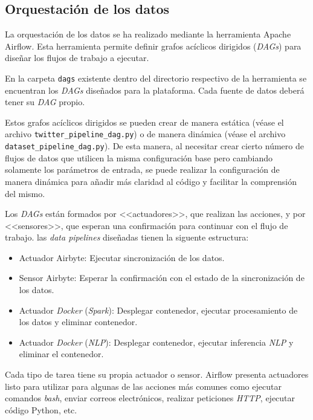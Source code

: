 \subsection{Orquestación de los datos}

La orquestación de los datos se ha realizado mediante la herramienta Apache Airflow. Esta herramienta permite definir grafos acíclicos dirigidos (\textit{DAGs}) para diseñar los flujos de trabajo a ejecutar.

En la carpeta \texttt{dags} existente dentro del directorio respectivo de la herramienta se encuentran los \textit{DAGs} diseñados para la plataforma. Cada fuente de datos deberá tener su \textit{DAG} propio.

Estos grafos acíclicos dirigidos se pueden crear de manera estática (véase el archivo \texttt{twitter\_pipeline\_dag.py}) o de manera dinámica (véase el archivo \texttt{dataset\_pipeline\_dag.py}). De esta manera, al necesitar crear cierto número de flujos de datos que utilicen la misma configuración base pero cambiando solamente los parámetros de entrada, se puede realizar la configuración de manera dinámica para añadir más claridad al código y facilitar la comprensión del mismo.

Los \textit{DAGs} están formados por <<actuadores>>, que realizan las acciones, y por <<sensores>>, que esperan una confirmación para continuar con el flujo de trabajo. las \textit{data pipelines} diseñadas tienen la siguente estructura:

\begin{itemize}
    \item Actuador Airbyte: Ejecutar sincronización de los datos.
    \item Sensor Airbyte: Esperar la confirmación con el estado de la sincronización de los datos.
    \item Actuador \textit{Docker} (\textit{Spark}): Desplegar contenedor, ejecutar procesamiento de los datos y eliminar contenedor.
    \item Actuador \textit{Docker} (\textit{NLP}): Desplegar contenedor, ejecutar inferencia \textit{NLP} y eliminar el contenedor.
\end{itemize}

Cada tipo de tarea tiene su propia actuador o sensor. Airflow presenta actuadores listo para utilizar para algunas de las acciones más comunes como ejecutar comandos \textit{bash}, enviar correos electrónicos, realizar peticiones \textit{HTTP}, ejecutar código Python, etc.



